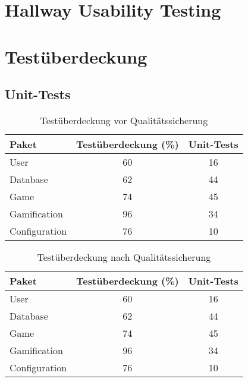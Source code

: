 \documentclass[a4paper]{scrreprt}
\begin{document}
    \chapter{Hallway Usability Testing}



    \chapter{Testüberdeckung}
        \section{Unit-Tests}
                \begin{table}[h]
                    \centering
                \begin{tabular}{ | l | c | c | }
                    \hline
                    Paket & Testüberdeckung (\%) & Unit-Tests \\ \hline
                    User & 60 & 16 \\
                    Database & 62 & 44 \\
                    Game & 74 & 45 \\
                    Gamification & 96 & 34 \\
                    Configuration & 76 & 10 \\
                    \hline
                \end{tabular}
                \caption{Testüberdeckung vor Qualitätssicherung}
                \end{table}%

                \begin{table}[h]
                    \centering
                \begin{tabular}{ | l | c | c | }
                    \hline
                    Paket & Testüberdeckung (\%) & Unit-Tests \\ \hline
                    User & 60 & 16 \\
                    Database & 62 & 44 \\
                    Game & 74 & 45 \\
                    Gamification & 96 & 34 \\
                    Configuration & 76 & 10 \\
                    \hline
                \end{tabular}
                \caption{Testüberdeckung nach Qualitätssicherung}
                \end{table}%
\end{document}
